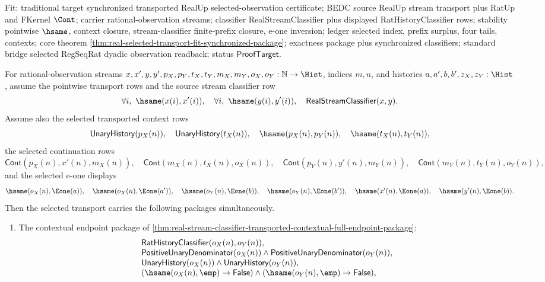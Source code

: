 Fit: traditional target synchronized transported RealUp selected-observation
certificate; BEDC source RealUp stream transport plus RatUp and FKernel
$\Cont$; carrier rational-observation streams; classifier RealStreamClassifier
plus displayed RatHistoryClassifier rows; stability pointwise $\hsame$, context
closure, stream-classifier finite-prefix closure, e-one inversion; ledger
selected index, prefix surplus, four tails, contexts; core theorem
\autoref{thm:real-selected-transport-fit-synchronized-package}; exactness
package plus synchronized classifiers; standard bridge selected RegSeqRat
dyadic observation readback; status $\mathsf{ProofTarget}$.

\begin{theorem}
\label{thm:real-selected-transport-fit-synchronized-from-stream-classifier}
For rational-observation streams
$x,x',y,y',p_X,p_Y,t_X,t_Y,m_X,m_Y,o_X,o_Y:\mathbb{N}\to\Hist$,
indices $m,n$, and histories $a,a',b,b',z_X,z_Y:\Hist$, assume the pointwise
transport rows and the source stream classifier row
$$
\forall i,\ \hsame(x(i),x'(i)),\quad
\forall i,\ \hsame(y(i),y'(i)),\quad
\mathsf{RealStreamClassifier}(x,y).
$$
Assume also the selected transported context rows
$$
\mathsf{UnaryHistory}(p_X(n)),\quad
\mathsf{UnaryHistory}(t_X(n)),\quad
\hsame(p_X(n),p_Y(n)),\quad
\hsame(t_X(n),t_Y(n)),
$$
the selected continuation rows
$$
\mathsf{Cont}(p_X(n),x'(n),m_X(n)),\quad
\mathsf{Cont}(m_X(n),t_X(n),o_X(n)),
\quad\mathsf{Cont}(p_Y(n),y'(n),m_Y(n)),\quad
\mathsf{Cont}(m_Y(n),t_Y(n),o_Y(n)),
$$
and the selected e-one displays
$$
\hsame(o_X(n),\Eone(a)),\quad
\hsame(o_X(n),\Eone(a')),\quad
\hsame(o_Y(n),\Eone(b)),\quad
\hsame(o_Y(n),\Eone(b')),\quad
\hsame(x'(n),\Eone(a)),\quad
\hsame(y'(n),\Eone(b)).
$$
Then the selected transport carries the following packages simultaneously.
\begin{enumerate}
\item The contextual endpoint package of
\autoref{thm:real-stream-classifier-transported-contextual-full-endpoint-package}:
$$
\begin{array}{l}
\mathsf{RatHistoryClassifier}(o_X(n),o_Y(n)),\\
\mathsf{PositiveUnaryDenominator}(o_X(n))\land
\mathsf{PositiveUnaryDenominator}(o_Y(n)),\\
\mathsf{UnaryHistory}(o_X(n))\land
\mathsf{UnaryHistory}(o_Y(n)),\\
(\hsame(o_X(n),\emp)\to\mathsf{False})\land
(\hsame(o_Y(n),\emp)\to\mathsf{False}),\\

\end{array}$$
\end{enumerate}
\end{theorem}
